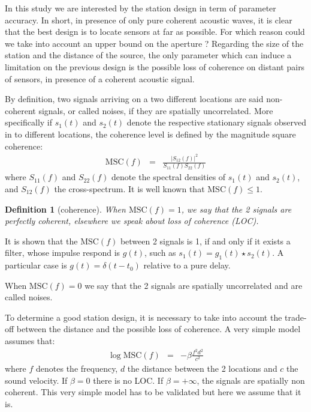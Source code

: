 \documentclass[a4paper, 12pt]{report}
\newtheorem{definition}{Definition}
\def\MSC{\mathrm{MSC}}
\begin{document}
 \sloppy


In this study we are interested by the station design in term of parameter accuracy. In short, in presence of only pure coherent acoustic waves, it is clear that the best design is to locate sensors at far as possible. For which reason could we take into account an upper bound on the aperture ? Regarding the size of the station and the distance of the source, the only parameter which can induce a limitation on the previous design is the possible loss of coherence on distant pairs of sensors, in presence of a coherent acoustic signal. 

By definition, two signals arriving on a two different locations are said non-coherent signals, or called noises, if they are spatially uncorrelated. More specifically if $s_{1}(t)$ and $s_{2}(t)$ denote the respective stationary signals observed in to different locations, the coherence level is defined by the magnitude square coherence:
\begin{eqnarray*}
 \MSC(f)&=&\frac{|S_{12}(f)|^{2}}{S_{11}(f)S_{22}(f)}
\end{eqnarray*}
where $S_{11}(f)$ and $S_{22}(f)$ denote the spectral densities of $s_{1}(t)$ and $s_{2}(t)$, and $S_{12}(f)$ the cross-spectrum. It is well known that $\MSC(f)\leq 1$. 
\begin{definition}[coherence]
\label{def:coherence2sensors}
When $\MSC(f)=1$, we say that the 2 signals are perfectly coherent, elsewhere we speak about loss of coherence (LOC). 
\end{definition}


It is shown that the  $\MSC(f)$ between 2 signals is 1, if and only if it exists a filter, whose impulse respond is $g(t)$, such as $s_{1}(t)=g_{1}(t)\star s_{2}(t)$. A particular case is $g(t)=\delta(t-t_{0})$ relative to a pure delay.


  \medskip
 When $\MSC(f)=0$ we say that the 2 signals are spatially uncorrelated and are called noises.




To determine a good station design, it is necessary to take into account the trade-off between the distance and the possible loss of coherence. A very simple model assumes that:
\begin{eqnarray*}
 \log\MSC(f) &=& -\beta \frac{f^{2}d^{2}}{c^{2}}
\end{eqnarray*}
where  $f$ denotes the frequency,  $d$  the distance between the 2 locations and $c$ the sound velocity. If $\beta=0$ there is no LOC. If $\beta=+\infty$, the signals are spatially non coherent. This very simple model has to be validated but here we assume that it is.
\end{document}
